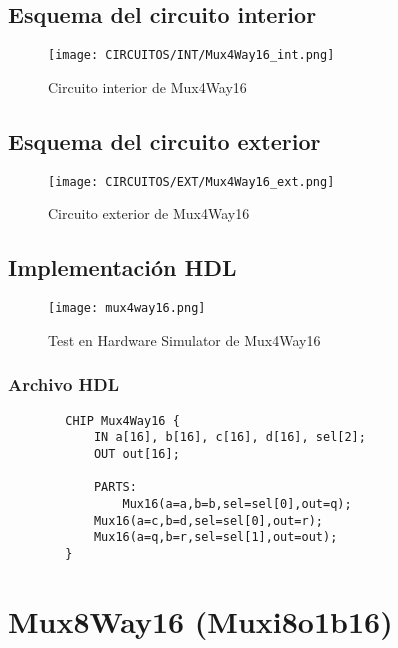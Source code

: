 \documentclass[12pt]{article}
\begin{document}
    \subsection{Esquema del circuito interior}
        \begin{figure}[H]
            \centering
            \texttt{[image: CIRCUITOS/INT/Mux4Way16\_int.png]}            \caption{Circuito interior de Mux4Way16 \cite{circuitverse}}
            \label{fig:mux4way16_int}
        \end{figure}
    \subsection{Esquema del circuito exterior}
        \begin{figure}[H]
            \centering
            \texttt{[image: CIRCUITOS/EXT/Mux4Way16\_ext.png]}            \caption{Circuito exterior de Mux4Way16 \cite{circuitverse}}
            \label{fig:mux4way16_ext}
        \end{figure}
    \subsection{Implementación HDL}
        \begin{figure}[H]
            \centering
            \texttt{[image: mux4way16.png]}
            \caption{Test en Hardware Simulator de Mux4Way16 \cite{nand2tetris}}
            \label{fig:hdlmux4way16}
        \end{figure}
        \subsubsection{Archivo HDL}
            \begin{lstlisting}
        CHIP Mux4Way16 {
            IN a[16], b[16], c[16], d[16], sel[2];
            OUT out[16];
        
            PARTS:
                Mux16(a=a,b=b,sel=sel[0],out=q); 
           	Mux16(a=c,b=d,sel=sel[0],out=r);
        	Mux16(a=q,b=r,sel=sel[1],out=out);
        }
            \end{lstlisting}
    \newpage


\section{Mux8Way16 (Muxi8o1b16)}
\end{document}
